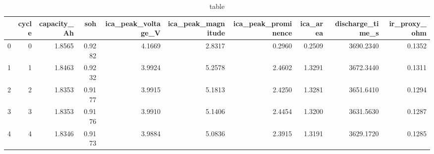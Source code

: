 \begin{table}
\caption{table}
\label{tab:table}
\begin{tabular}{lrrrrrrrrr}
\toprule
 & cycle & capacity\_Ah & soh & ica\_peak\_voltage\_V & ica\_peak\_magnitude & ica\_peak\_prominence & ica\_area & discharge\_time\_s & ir\_proxy\_ohm \\
\midrule
0 & 0 & 1.8565 & 0.9282 & 4.1669 & 2.8317 & 0.2960 & 0.2509 & 3690.2340 & 0.1352 \\
1 & 1 & 1.8463 & 0.9232 & 3.9924 & 5.2578 & 2.4602 & 1.3291 & 3672.3440 & 0.1311 \\
2 & 2 & 1.8353 & 0.9177 & 3.9915 & 5.1813 & 2.4250 & 1.3281 & 3651.6410 & 0.1294 \\
3 & 3 & 1.8353 & 0.9176 & 3.9910 & 5.1406 & 2.4454 & 1.3200 & 3631.5630 & 0.1287 \\
4 & 4 & 1.8346 & 0.9173 & 3.9884 & 5.0836 & 2.3915 & 1.3191 & 3629.1720 & 0.1285 \\
\bottomrule
\end{tabular}
\end{table}
